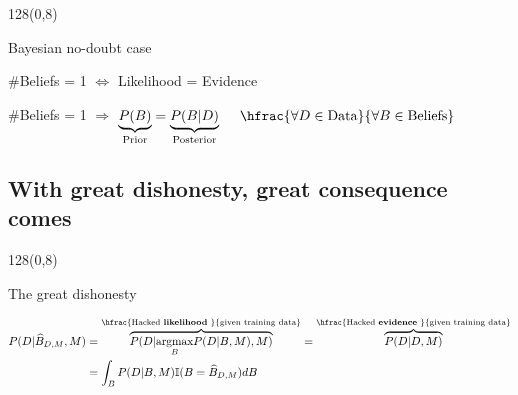 \documentclass[shownotes]{beamer}
\begin{document}
\begin{frame}
 \begin{textblock}{128}(0,8)
\begin{center}
 \Large Bayesian no-doubt case
\end{center}
\end{textblock}
\vspace{0.5cm}

 
\begin{mdframed}[backgroundcolor=black!15]
\centering
 $\#$Beliefs = 1  $\Longleftrightarrow$ Likelihood = Evidence  
\end{mdframed}
 
 \vspace{0.9cm}
\pause

 
 \begin{mdframed}[backgroundcolor=black!15]
 \centering
 $\#$Beliefs = 1 $\Longrightarrow$ $\underbrace{P(B)}_{\text{\scriptsize Prior}} = \underbrace{P(B|D)}_{\text{\scriptsize Posterior}} \ \ \ \ \hfrac{\forall D \in \text{Data}}{\forall B \in \text{Beliefs}}$
\end{mdframed}

\end{frame}


\subsection{With great dishonesty, great consequence comes}

\begin{frame}
 \begin{textblock}{128}(0,8)
\begin{center}
 \large The great dishonesty
\end{center}
\end{textblock}

\begin{mdframed}
\end{mdframed}

\vspace{0.6cm}

 \begin{equation*}
\begin{split}
P(D|\widehat{B}_{D,M},M) & = \overbrace{P(D|\underset{B}{\text{argmax}} P(D|B,M), M)}^{\hfrac{\text{\scriptsize Hacked \textbf{likelihood} }}{\text{\scriptsize  given training data}}} = \overbrace{P(D|D, M)}^{\hfrac{\text{\scriptsize Hacked \textbf{evidence} }}{\text{\scriptsize given training data}}}\\
&= \int_B P(D|B,M) \mathbb{I}(B=\widehat{B}_{D,M} ) dB
\end{split}
 \end{equation*}

 
\end{frame}
\end{document}
